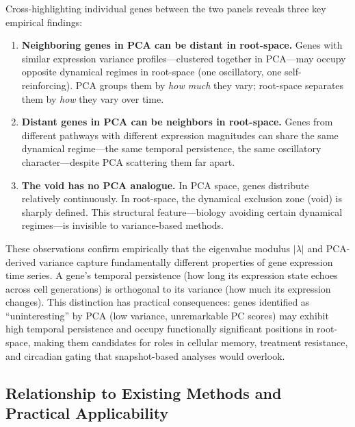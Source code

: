 \documentclass[11pt,letterpaper]{article}
\begin{document}
Cross-highlighting individual genes between the two panels reveals three key empirical findings:

\begin{enumerate}[noitemsep]
    \item \textbf{Neighboring genes in PCA can be distant in root-space.} Genes with similar expression variance profiles---clustered together in PCA---may occupy opposite dynamical regimes in root-space (one oscillatory, one self-reinforcing). PCA groups them by \textit{how much} they vary; root-space separates them by \textit{how} they vary over time.
    \item \textbf{Distant genes in PCA can be neighbors in root-space.} Genes from different pathways with different expression magnitudes can share the same dynamical regime---the same temporal persistence, the same oscillatory character---despite PCA scattering them far apart.
    \item \textbf{The void has no PCA analogue.} In PCA space, genes distribute relatively continuously. In root-space, the dynamical exclusion zone (void) is sharply defined. This structural feature---biology avoiding certain dynamical regimes---is invisible to variance-based methods.
\end{enumerate}

These observations confirm empirically that the eigenvalue modulus $|\lambda|$ and PCA-derived variance capture fundamentally different properties of gene expression time series. A gene's temporal persistence (how long its expression state echoes across cell generations) is orthogonal to its variance (how much its expression changes). This distinction has practical consequences: genes identified as ``uninteresting'' by PCA (low variance, unremarkable PC scores) may exhibit high temporal persistence and occupy functionally significant positions in root-space, making them candidates for roles in cellular memory, treatment resistance, and circadian gating that snapshot-based analyses would overlook.

\subsection{Relationship to Existing Methods and Practical Applicability}
\end{document}
